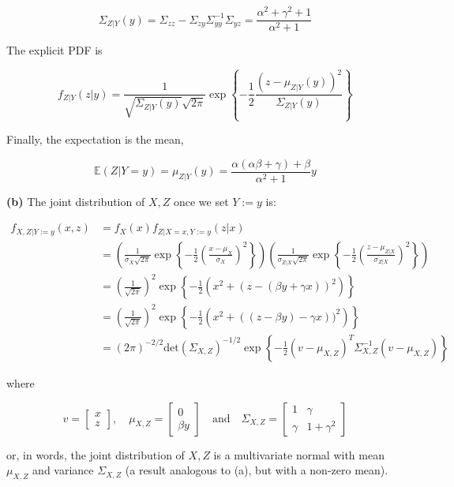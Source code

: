 \[ \Sigma_{Z | Y}(y) = \Sigma_{zz} - \Sigma_{zy} \Sigma_{yy}^{-1} \Sigma_{yz} = \frac{\alpha^{2} + \gamma^{2} + 1}{\alpha^{2} + 1}\]

The explicit PDF is

\[ f_{Z | Y}(z | y) = \frac{1}{\sqrt{\Sigma_{Z | Y}(y)} \sqrt{2 \pi}} \exp \left\{ -\frac{1}{2} \frac{\left( z - \mu_{Z | Y}(y) \right)^{2}}{\Sigma_{Z | Y}(y)} \right\} \]

Finally, the expectation is the mean,

\[\mathbb{E}(Z | Y = y) = \mu_{Z | Y} (y) = \frac{\alpha(\alpha \beta + \gamma) + \beta}{\alpha^{2} + 1} y\]

\textbf{(b)} The joint distribution of \(X, Z\) once we set \(Y := y\)
is:

\begin{align*}
f_{X, Z | Y := y}(x, z) &= f_X(x) f_{Z | X = x, Y := y}(z | x) \\
&= \left(\frac{1}{\sigma_X \sqrt{2\pi}} \exp \left\{-\frac{1}{2} \left(\frac{x - \mu_X}{\sigma_X}\right)^{2} \right\} \right)
\left(\frac{1}{\sigma_{Z | X} \sqrt{2\pi}} \exp \left\{-\frac{1}{2} \left(\frac{z - \mu_{Z | X}}{\sigma_{Z | X}}\right)^{2} \right\}\right) \\
&= \left( \frac{1}{\sqrt{2 \pi}} \right)^{2} \exp \left\{ -\frac{1}{2} \left( x^{2} + (z - (\beta y + \gamma x))^{2}\right) \right\} \\
&= \left( \frac{1}{\sqrt{2 \pi}} \right)^{2} \exp \left\{ -\frac{1}{2} \left( x^{2} + ((z - \beta y) - \gamma x))^{2}\right) \right\} \\
&= (2 \pi)^{-2 / 2} \text{det} (\Sigma_{X, Z})^{-1/2} \exp \left\{ -\frac{1}{2} (v - \mu_{X, Z})^T \Sigma_{X, Z}^{-1} (v - \mu_{X, Z})\right\}
\end{align*}

where

\[
v = \begin{bmatrix}x \\ z\end{bmatrix},
\quad \mu_{X, Z} = \begin{bmatrix}0 \\ \beta y\end{bmatrix}
\quad \text{and} \quad
\Sigma_{X, Z} = \begin{bmatrix}
1  & \gamma \\
\gamma & 1 + \gamma^{2}
\end{bmatrix}
\]

or, in words, the joint distribution of \(X, Z\) is a multivariate
normal with mean \(\mu_{X, Z}\) and variance \(\Sigma_{X, Z}\) (a result
analogous to (a), but with a non-zero mean).

